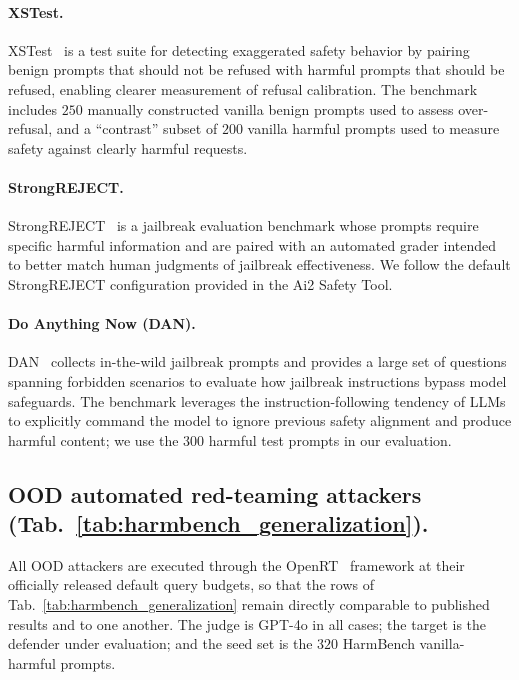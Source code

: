 \documentclass{article}
\begin{document}
\paragraph{XSTest.} XSTest~\citep{rottger2023xstest} is a test suite for detecting exaggerated safety behavior by pairing benign prompts that should not be refused with harmful prompts that should be refused, enabling clearer measurement of refusal calibration. The benchmark includes $250$ manually constructed vanilla benign prompts used to assess over-refusal, and a ``contrast'' subset of $200$ vanilla harmful prompts used to measure safety against clearly harmful requests.

\paragraph{StrongREJECT.} StrongREJECT~\citep{souly2024strongreject} is a jailbreak evaluation benchmark whose prompts require specific harmful information and are paired with an automated grader intended to better match human judgments of jailbreak effectiveness. We follow the default StrongREJECT configuration provided in the Ai2 Safety Tool.

\paragraph{Do Anything Now (DAN).} DAN~\citep{shen2023doanythingnow} collects in-the-wild jailbreak prompts and provides a large set of questions spanning forbidden scenarios to evaluate how jailbreak instructions bypass model safeguards. The benchmark leverages the instruction-following tendency of LLMs to explicitly command the model to ignore previous safety alignment and produce harmful content; we use the $300$ harmful test prompts in our evaluation.

\subsection{OOD automated red-teaming attackers (Tab.~\ref{tab:harmbench_generalization}).}
\label{apdx:bench-openrt}

All OOD attackers are executed through the OpenRT~\citep{OpenRT2026} framework at their officially released default query budgets, so that the rows of Tab.~\ref{tab:harmbench_generalization} remain directly comparable to published results and to one another. The judge is GPT-4o in all cases; the target is the defender under evaluation; and the seed set is the $320$ HarmBench vanilla-harmful prompts.
\end{document}
